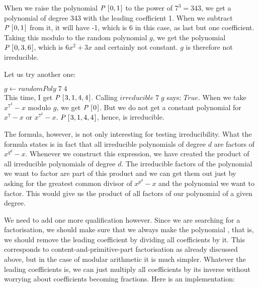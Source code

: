\documentclass[tikz]{scrreprt}
\newcommand{\Conid}[1]{\mathit{#1}}
\newcommand{\Varid}[1]{\mathit{#1}}
\begin{document}
When we raise the polynomial \ensuremath{\Conid{P}\;[\mskip1.5mu \mathrm{0},\mathrm{1}\mskip1.5mu]} 
to the power of $7^3 = 343$,
we get a polynomial of degree 343
with the leading coefficient 1.
When we subtract \ensuremath{\Conid{P}\;[\mskip1.5mu \mathrm{0},\mathrm{1}\mskip1.5mu]} from it,
it will have -1, which is 6 in this case,
as last but one coefficient.
Taking this modulo to the random polynomial $g$,
we get the polynomial \ensuremath{\Conid{P}\;[\mskip1.5mu \mathrm{0},\mathrm{3},\mathrm{6}\mskip1.5mu]}, which is 
$6x^2 + 3x$ and certainly not constant.
$g$ is therefore not irreducible.

Let us try another one:

\ensuremath{\Varid{g}\leftarrow \Varid{randomPoly}\;\mathrm{7}\;\mathrm{4}}\\

This time, I get \ensuremath{\Conid{P}\;[\mskip1.5mu \mathrm{3},\mathrm{1},\mathrm{4},\mathrm{4}\mskip1.5mu]}.
Calling \ensuremath{\Varid{irreducible}\;\mathrm{7}\;\Varid{g}} says: \ensuremath{\Conid{True}}.
When we take $x^{7^3} - x$ modulo $g$,
we get \ensuremath{\Conid{P}\;[\mskip1.5mu \mathrm{0}\mskip1.5mu]}. But we do not get a 
constant polynomial for $x^7 - x$ or
$x^{7^2} -x $. \ensuremath{\Conid{P}\;[\mskip1.5mu \mathrm{3},\mathrm{1},\mathrm{4},\mathrm{4}\mskip1.5mu]}, hence,
is irreducible.

The formula, however, is not only interesting
for testing irreducibility.
What the formula states is in fact that
all irreducible polynomials of degree $d$
are factors of $x^{q^d} - x$.
Whenever we construct this expression,
we have created the product of all 
irreducible polynomials of degree $d$.
The irreducible factors of the polynomial we want to factor
are part of this product and we can get them out
just by asking for the greatest common divisor
of $x^{p^d} - x$ and the polynomial we want to factor.
This would give us the product of all factors
of our polynomial of a given degree.

We need to add one more qualification however.
Since we are searching for a 
factorisation, we should make sure that
we always make the polynomial ,
that is, we should remove the leading coefficient
by dividing all coefficients by it.
This corresponds to content-and-primitive-part factorisation
as already discussed above, but in the case of modular
arithmetic it is much simpler. Whatever the leading coefficients
is, we can just multiply all coefficients by its inverse
without worrying about coefficients becoming fractions.
Here is an implementation:
\end{document}
